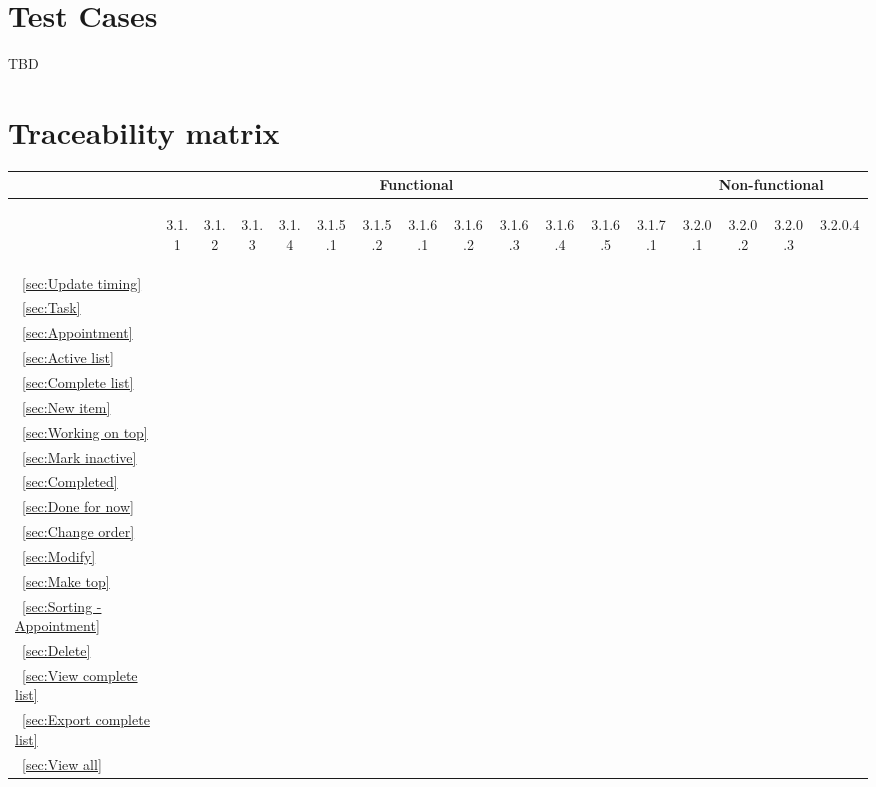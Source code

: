 \documentclass[12pt]{article}
\renewcommand{\c}{\checkmark}
\newcommand{\s}[1] {\begin{sideways}#1\end{sideways}}
\begin{document}
\section{Test Cases}
TBD


\section{Traceability matrix}
\begin{center}
\begin{tabular}{|l||*{12}{c|}|*{4}{c|}}
\hline
\multicolumn{1}{|c||}{ }&
\multicolumn{12}{|c||}{Functional} &
\multicolumn{4}{|c|}{Non-functional}\\
\hline
	& \s{3.1.1} & \s{3.1.2} & \s{3.1.3} & \s{3.1.4} & \s{3.1.5.1} & \s{3.1.5.2} & \s{3.1.6.1} & \s{3.1.6.2} & \s{3.1.6.3} & \s{3.1.6.4} & \s{3.1.6.5} & \s{3.1.7.1} & \s{3.2.0.1} & \s{3.2.0.2} & \s{3.2.0.3} & \s{3.2.0.4~~}\\
\hline
\hline
~\ref{sec:Update timing}	&	&	&	&	&	&	&	&	&	&	&	&	&\c	&	&	&	\\
\hline
~\ref{sec:Task}				&\c	&	&	&	&	&	&	&	&	&	&	&	&	&	&	&	\\
\hline
~\ref{sec:Appointment}		&	&\c	&	&	&	&	&	&	&	&	&	&	&	&	&	&	\\
\hline
~\ref{sec:Active list}		&	&	&\c	&	&	&	&	&	&	&	&	&	&	&	&	&	\\
\hline
~\ref{sec:Complete list}	&	&	&	&\c	&	&	&	&	&	&	&	&	&	&\c	&	&	\\
\hline
~\ref{sec:New item}			&	&	&	&	&	&	&	&	&	&	&	&	&	&	&	&	\\
\hline
~\ref{sec:Working on top}	&	&	&	&	&	&	&\c	&	&	&	&	&	&	&	&	&	\\
\hline
~\ref{sec:Mark inactive}	&	&	&	&	&	&	&	&\c	&	&	&	&	&	&	&	&	\\
\hline
~\ref{sec:Completed}		&	&	&	&	&	&	&	&	&\c	&	&	&	&	&	&	&	\\
\hline
~\ref{sec:Done for now}		&	&	&	&	&	&	&	&	&	&\c	&	&	&	&	&	&	\\
\hline
~\ref{sec:Change order}		&	&	&	&	&	&\c	&	&	&	&	&\c	&	&	&	&	&	\\
\hline
~\ref{sec:Modify}			&	&	&	&	&\c	&	&	&	&	&	&	&	&	&	&	&	\\
\hline
~\ref{sec:Make top}			&	&	&	&	&	&\c	&	&	&	&	&	&	&	&	&	&	\\
\hline
~\ref{sec:Sorting - Appointment}
							&	&	&	&	&	&	&	&	&	&	&	&\c	&\c	&	&	&	\\
\hline
~\ref{sec:Delete}			&	&	&	&	&	&	&	&	&	&	&	&	&	&	&	&\c	\\
\hline
~\ref{sec:View complete list}
							&	&	&	&	&	&	&	&	&	&	&	&	&	&	&\c	&	\\
\hline
~\ref{sec:Export complete list}
							&	&	&	&	&	&	&	&	&	&	&	&	&	&	&\c	&	\\
\hline
~\ref{sec:View all}			&	&	&	&	&	&	&	&	&	&	&	&	&	&	&\c	&	\\
\hline
\end{tabular}
\end{center}
\end{document}
